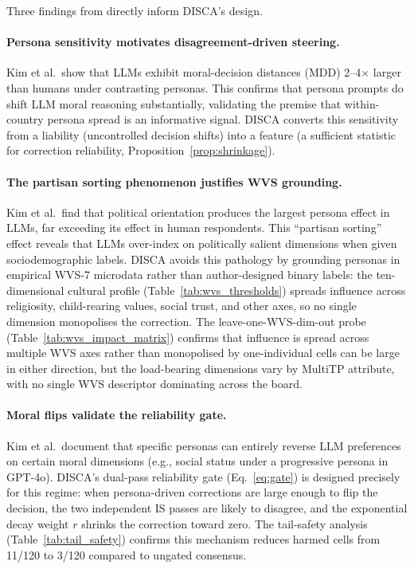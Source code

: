 \documentclass{article}
\begin{document}
Three findings from \citet{kim2025persona} directly inform DISCA's design.

\paragraph{Persona sensitivity motivates disagreement-driven steering.} Kim et al.\ show that LLMs exhibit moral-decision distances (MDD) 2--4$\times$ larger than humans under contrasting personas. This confirms that persona prompts do shift LLM moral reasoning substantially, validating the premise that within-country persona spread is an informative signal. DISCA converts this sensitivity from a liability (uncontrolled decision shifts) into a feature (a sufficient statistic for correction reliability, Proposition~\ref{prop:shrinkage}).

\paragraph{The partisan sorting phenomenon justifies WVS grounding.} Kim et al.\ find that political orientation produces the largest persona effect in LLMs, far exceeding its effect in human respondents. This ``partisan sorting'' effect reveals that LLMs over-index on politically salient dimensions when given sociodemographic labels. DISCA avoids this pathology by grounding personas in empirical WVS-7 microdata rather than author-designed binary labels: the ten-dimensional cultural profile (Table~\ref{tab:wvs_thresholds}) spreads influence across religiosity, child-rearing values, social trust, and other axes, so no single dimension monopolises the correction. The leave-one-WVS-dim-out probe (Table~\ref{tab:wvs_impact_matrix}) confirms that influence is spread across multiple WVS axes rather than monopolised by one-individual cells can be large in either direction, but the load-bearing dimensions vary by MultiTP attribute, with no single WVS descriptor dominating across the board.

\paragraph{Moral flips validate the reliability gate.} Kim et al.\ document that specific personas can entirely reverse LLM preferences on certain moral dimensions (e.g., social status under a progressive persona in GPT-4o). DISCA's dual-pass reliability gate (Eq.~\ref{eq:gate}) is designed precisely for this regime: when persona-driven corrections are large enough to flip the decision, the two independent IS passes are likely to disagree, and the exponential decay weight $r$ shrinks the correction toward zero. The tail-safety analysis (Table~\ref{tab:tail_safety}) confirms this mechanism reduces harmed cells from 11/120 to 3/120 compared to ungated consensus.
\end{document}

